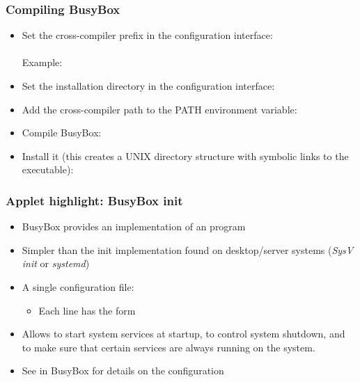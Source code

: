 \begin{frame}
  \frametitle{Compiling BusyBox}
  \begin{itemize}
  \item Set the cross-compiler prefix in the configuration interface: \\
    \\
    Example: 
  \item Set the installation directory in the configuration interface: \\
  \item Add the cross-compiler path to the PATH environment variable:\\
  \item Compile BusyBox:\\
  \item Install it (this creates a UNIX directory structure with symbolic
    links to the  executable):\\
  \end{itemize}
\end{frame}

\begin{frame}
  \frametitle{Applet highlight: BusyBox init}
  \begin{itemize}
  \item BusyBox provides an implementation of an  program
  \item Simpler than the init implementation found on desktop/server
    systems ({\em SysV init} or {\em systemd})
  \item A single configuration file: 
    \begin{itemize}
    \item Each line has the form 
    \end{itemize}
  \item Allows to start system services at startup, to control system
        shutdown, and to make sure that certain services are always
        running on the system.
  \item See  in BusyBox for details on the
    configuration
  \end{itemize}
\end{frame}

